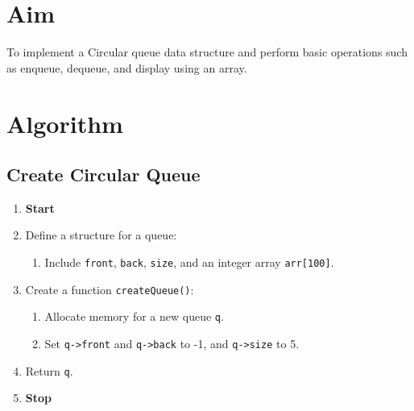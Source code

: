 
\section{Aim}
To implement a Circular queue data structure and perform basic operations such as enqueue, dequeue, and display using an array.

\section{Algorithm}
 {\selectfont

  \subsection{Create Circular Queue}
  \begin{enumerate}[label=\arabic*:,left=0pt]
    \item \textbf{Start}
    \item Define a structure for a queue:
          \begin{enumerate}[label=2.\arabic*.]
            \item Include \texttt{front}, \texttt{back}, \texttt{size}, and an integer array \texttt{arr[100]}.
          \end{enumerate}
    \item Create a function \texttt{createQueue()}:
          \begin{enumerate}[label=3.\arabic*.]
            \item Allocate memory for a new queue \texttt{q}.
            \item Set \texttt{q->front} and \texttt{q->back} to -1, and \texttt{q->size} to 5.
          \end{enumerate}
    \item Return \texttt{q}.
    \item \textbf{Stop}
  \end{enumerate}

}
